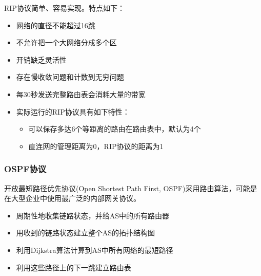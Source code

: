 \myhline
RIP协议简单、容易实现。特点如下：
\begin{itemize}
\item 网络的直径不能超过16跳
\item 不允许把一个大网络分成多个区
\item 开销缺乏灵活性
\item 存在慢收敛问题和计数到无穷问题
\item 每30秒发送完整路由表会消耗大量的带宽
\item 实际运行的RIP协议具有如下特性：
\begin{itemize}
\item 可以保存多达6个等距离的路由在路由表中，默认为4个
\item 直连网的管理距离为0，RIP协议的距离为1
\end{itemize}
\end{itemize}

\subsubsection{OSPF协议}
开放最短路径优先协议(Open Shortest Path First, OSPF)采用路由算法，可能是在大型企业中使用最广泛的内部网关协议。
\begin{itemize}
\item 周期性地收集链路状态，并给AS中的所有路由器
\item 用收到的链路状态建立整个AS的拓扑结构图
\item 利用Dijkstra算法计算到AS中所有网络的最短路径
\item 利用这些路径上的下一跳建立路由表
\end{itemize}

